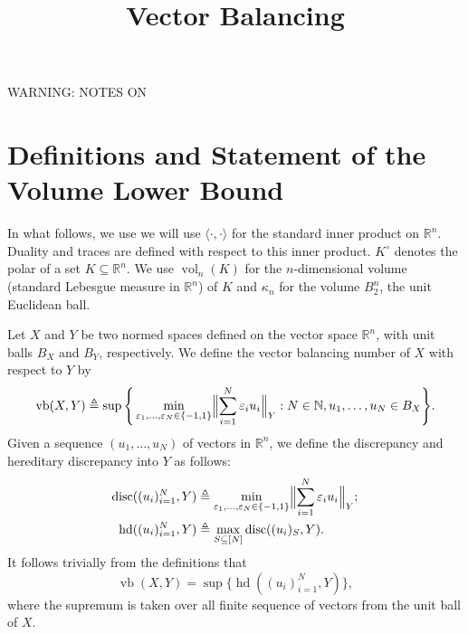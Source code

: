 \documentclass[12pt]{article}
\newcommand{\R}{{\mathbb{R}}}
\newcommand{\T}{\mathsf T}
\newcommand\eps{\varepsilon}
\newcommand{\eqdef}{\triangleq}
\newcommand{\inner}[2]{\langle #1, #2 \rangle}
\DeclareMathOperator{\vollb}{volLB}
\DeclareMathOperator{\disc}{disc}
\DeclareMathOperator{\hd}{hd}
\DeclareMathOperator{\vb}{vb}
\DeclareMathOperator{\vol}{vol}
\DeclareMathOperator{\lspan}{span}
\newcommand{\noteswarning}{{\begin{center} {\Large WARNING: NOTES ON}\end{center}}}
\newcommand{\noteswarning}{{}}
\begin{document}
\title{Vector Balancing}
\maketitle

\noteswarning


\section{Definitions and Statement of the Volume Lower Bound}

In what follows, we use we will use $\inner{\cdot}{\cdot}$
for the standard inner product on $\R^n$. Duality and traces are
defined with respect to this inner product. $K^\circ$ denotes the
polar of a set $K \subseteq \R^n$. We use $\vol_n(K)$ for the
$n$-dimensional volume (standard Lebesgue measure in $\R^n$) of $K$ and
$\kappa_n$ for the volume $B_2^n$, the unit Euclidean ball.

Let $X$ and $Y$ be two normed spaces defined on the vector space
$\R^n$, with unit balls $B_X$ and $B_Y$, respectively. We define
the vector balancing number of $X$ with respect to $Y$ by
\[
\vb(X, Y) \eqdef \sup\Bigg\{ 
\min_{\eps_1, \ldots,\eps_N \in \{-1, 1\}} \Bigl\|\sum_{i = 1}^N{\eps_i u_i}\Bigr\|_{Y}: N \in \mathbb{N},
u_1, \ldots, u_N \in B_X\Bigg\}.
\]
Given a sequence $(u_1, \ldots, u_N)$ of vectors in $\R^n$, we define the
discrepancy and hereditary discrepancy into $Y$ as follows:
\begin{align*}
\disc((u_i)_{i = 1}^N,Y) &\eqdef \min_{\eps_1, \ldots,\eps_N \in
  \{-1, 1\}}
\Bigl\|\sum_{i = 1}^N{\eps_i u_i}\Bigr\|_{Y};\\
\hd((u_i)_{i = 1}^N, Y) &\eqdef \max_{S \subseteq  [N]}{\disc((u_i)_S, Y)}.
\end{align*}
It follows trivially from the definitions that 
\[
\vb(X, Y) = \sup\{\hd((u_i)_{i = 1}^N, Y)\},
\]
where the supremum is taken over all finite sequence of vectors from the unit
ball of $X$.

\end{document}
